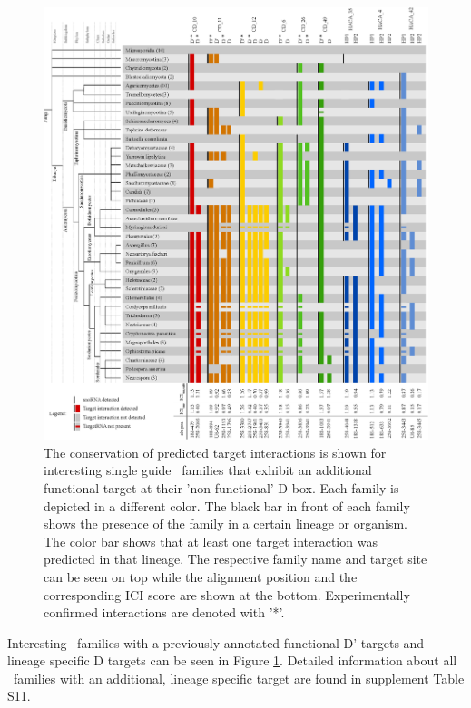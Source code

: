 \begin{figure}
  \centering
  \includegraphics[width=\textwidth]{pics/conservation_lineage_specific_targets.eps}
  \caption{The conservation of predicted target interactions is shown
    for interesting single guide \cd\ families that exhibit an
    additional functional target at their 'non-functional' D box. Each
    family is depicted in a different color. The black bar in front of
    each family shows the presence of the family in a certain lineage
    or organism. The color bar shows that at least one target
    interaction was predicted in that lineage. The respective family
    name and target site can be seen on top while the alignment
    position and the corresponding ICI score are shown at the
    bottom. Experimentally confirmed interactions are denoted with
    '*'.}
  \label{fig:additional_targets}
\end{figure}

Interesting \cd\ families with a previously annotated functional D'
targets and lineage specific D targets can be seen in Figure
\ref{fig:additional_targets}. Detailed information about all \sno\
families with an additional, lineage specific target are found in
supplement Table S11.

